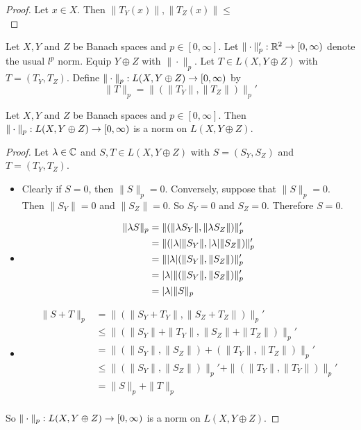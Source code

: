 \documentclass{book}
\begin{document}
	\begin{proof}
	Let $x \in X$. Then $\|T_Y(x)\|, \|T_Z(x)\| \leq $
	\\ 
	\end{proof}

	\begin{defn}
	Let $X, Y$ and $Z$ be Banach spaces and $p \in [0, \infty]$. Let $\| \cdot \|'_p: \mathbb{R}^2 \rightarrow [0, \infty)$ denote the usual $l^p$ norm. Equip $Y \oplus Z$ with $\|\cdot\|_p$. Let $T \in L(X, Y \oplus Z)$ with $T = (T_Y, T_Z)$. Define $\|\cdot \|_p: L(X, Y \oplus Z) \rightarrow [0,\infty)$ by $$\|T\|_p = \|(\|T_Y\|, \|T_Z\|)\|_p'$$
	\end{defn}
	
	\begin{ex}
	Let $X, Y$ and $Z$ be Banach spaces and $p \in [0, \infty]$. Then $\|\cdot \|_p: L(X, Y \oplus Z) \rightarrow [0,\infty)$ is a norm on $L(X, Y \oplus Z)$. 
	\end{ex}
	
	\begin{proof}
	Let $\lambda \in \mathbb{C}$ and $S, T \in L(X, Y \oplus Z)$ with $S= (S_Y, S_Z)$ and $T = (T_Y, T_Z)$. 
	\begin{itemize}
	\item Clearly if $S = 0$, then $\|S\|_p = 0$. Conversely, suppose that $\|S\|_p = 0$. Then $\|S_Y\| = 0$ and $\|S_Z\| = 0$. So $S_Y = 0$ and $S_Z = 0$. Therefore $S = 0$. 
	\item 
	\begin{align*}
	\|\lambda S\|_p
	&= \|(\|\lambda S_Y\|, \|\lambda S_Z\|)\|_p' \\
	&= \|(|\lambda|\| S_Y\|, |\lambda|\|S_Z \|)\|_p' \\
	&= \||\lambda| (\| S_Y\|,\|S_Z\| )\|_p' \\
	&= |\lambda| \|(\| S_Y\|,\|S_Z\|)\|_p' \\
	&= |\lambda| \| S\|_p
	\end{align*}
	\item 
	\begin{align*}
	\|S + T\|_p
	&= \|(\|S_Y + T_Y\|, \|S_Z + T_Z\|)\|_p' \\
	&\leq \|(\|S_Y\| + \|T_Y\|, \|S_Z\| + \|T_Z\|)\|_p' \\
	&= \|(\|S_Y\|, \|S_Z\|) + (\|T_Y\|, \|T_Z\|)\|_p' \\
	&\leq \|(\|S_Y\|, \|S_Z\|)\|_p' + \|(\|T_Y\|, \|T_Y\|)\|_p' \\
	&= \|S\|_p + \|T\|_p \\ 
	\end{align*}
	\end{itemize}
	So $\|\cdot \|_p: L(X, Y \oplus Z) \rightarrow [0,\infty)$ is a norm on $L(X, Y \oplus Z)$. 
	\end{proof}
	
\end{document}
